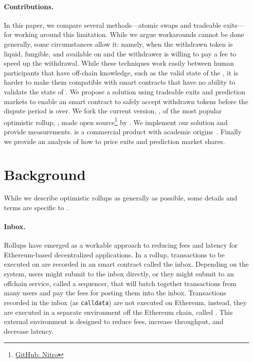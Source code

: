 \paragraph{Contributions.} In this paper, we compare several methods---atomic swaps and tradeable exits---for working around this limitation. While we argue workarounds cannot be done generally, some circumstances allow it: namely, when the withdrawn token is liquid, fungible, and available on \layerone and the withdrawer is willing to pay a fee to speed up the withdrawal.  While these techniques work easily between human participants that have off-chain knowledge, such as the valid state of the \layertwo, it is harder to make them compatible with \layerone smart contracts that have no ability to validate the state of \layertwo. We propose a solution using tradeable exits and prediction markets to enable an \layerone smart contract to safely accept withdrawn tokens before the dispute period is over. We fork the current version, \nitro, of the most popular optimistic rollup, \arb, made open source\footnote{\href{https://github.com/OffchainLabs/nitro}{GitHub: Nitro}} by \offchain. We implement our solution and provide measurements. \arb is a commercial product with academic origins~\cite{kalodner2018arbitrum}. Finally we provide an analysis of how to price exits and prediction market shares.  


 

\section{Background} 

While we describe optimistic rollups as generally as possible, some details and terms are specific to \arb. 

\paragraph{Inbox.} Rollups have emerged as a workable approach to reducing fees and latency for Ethereum-based decentralized applications. In a rollup,  transactions to be executed on \layertwo are recorded in an \layerone smart contract called the inbox. Depending on the system, users might submit to the inbox directly, or they might submit to an offchain service, called a sequencer, that will batch together transactions from many users and pay the \layerone fees for posting them into the inbox. Transactions recorded in the inbox (as \texttt{calldata}) are not executed on Ethereum, instead, they are executed in a separate environment off the Ethereum chain, called \layertwo. This external environment is designed to reduce fees, increase throughput, and decrease latency. 

